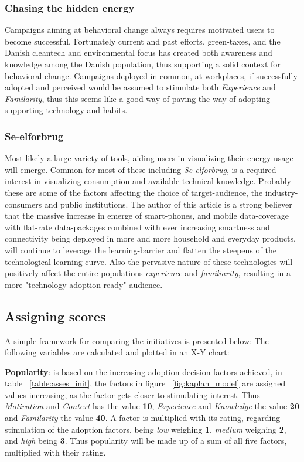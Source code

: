 \documentclass[journal]{IEEEtran}
\begin{document}
\subsubsection{Chasing the hidden energy}
Campaigns aiming at behavioral change always requires motivated users to become successful. Fortunately current and past efforts, green-taxes, and the Danish cleantech and environmental focus has created both awareness and knowledge among the Danish population, thus supporting a solid context for behavioral change. Campaigns deployed in common, at workplaces, if successfully adopted and perceived would be assumed to stimulate both \textit{Experience} and \textit{Familarity}, thus this seems like a good way of paving the way of adopting supporting technology and habits. 

\subsubsection{Se-elforbrug}
Most likely a large variety of tools, aiding users in visualizing their energy usage will emerge. Common for most of these including \textit{Se-elforbrug}, is a required interest in visualizing consumption and available technical knowledge. Probably these are some of the factors affecting the choice of target-audience, the industry-consumers and public institutions.
The author of this article is a strong believer that the massive increase in emerge of smart-phones, and mobile data-coverage with flat-rate data-packages combined with ever increasing smartness and connectivity being deployed in more and more household and everyday products, will continue to leverage the learning-barrier and flatten the steepens of the technological learning-curve. Also the pervasive nature of these technologies will positively affect the entire populations \textit{experience} and \textit{familiarity}, resulting in a more "technology-adoption-ready" audience.

\subsection{Assigning scores}
A simple framework for comparing the initiatives is presented below:
The following variables are calculated and plotted in an X-Y chart: \newline

\textbf{Popularity}: is based on the increasing adoption decision factors achieved, in table ~\ref{table:asses_init}, the factors in figure ~\ref{fig:kaplan_model} are assigned values increasing, as the factor gets closer to stimulating interest.
Thus \textit{Motivation} and \textit{Context} has the value \textbf{10}, \textit{Experience} and \textit{Knowledge} the value \textbf{20} and \textit{Familarity} the value \textbf{40}. A factor is multiplied with its rating, regarding stimulation of the adoption factors, being \textit{low} weighing \textbf{1}, \textit{medium} weighing \textbf{2}, and \textit{high} being \textbf{3}.
Thus popularity will be made up of a sum of all five factors, multiplied with their rating.\newline
\end{document}
